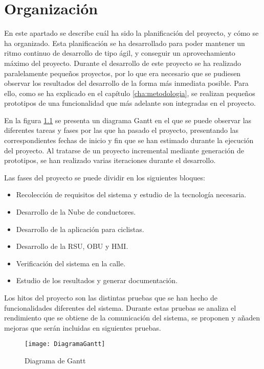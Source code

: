 \chapter{Organización}
En este apartado se describe cuál ha sido la planificación del proyecto, y cómo 
se ha organizado. Esta planificación se ha desarrollado para poder mantener un
ritmo continuo de desarrollo de tipo ágil, y conseguir un aprovechamiento máximo
del proyecto. Durante el desarrollo de este proyecto se ha realizado paralelamente
pequeños proyectos, por lo que era necesario que se pudiesen observar los resultados
del desarrollo de la forma más inmediata posible. Para ello, como se ha explicado
en el capítulo \ref{cha:metodologia}, se realizan pequeños prototipos de una
funcionalidad que más adelante son integradas en el proyecto.

En la figura \ref{fig:gantt} se presenta un diagrama Gantt en el que se puede observar
las diferentes tareas y fases por las que ha pasado el proyecto, presentando las
correspondientes fechas de inicio y fin que se han estimado durante la ejecución del
proyecto. Al tratarse de un proyecto incremental mediante generación de prototipos,
se han realizado varias iteraciones durante el desarrollo.

Las fases del proyecto se puede dividir en los siguientes bloques:
\begin{itemize}
	\item Recolección de requisitos del sistema y estudio de la tecnología necesaria.
	\item Desarrollo de la Nube de conductores.
	\item Desarrollo de la aplicación para ciclistas.
	\item Desarrollo de la RSU, OBU y HMI.
	\item Verificación del sistema en la calle.
	\item Estudio de los resultados y generar documentación.
\end{itemize}

Los hitos del proyecto son las distintas pruebas que se han hecho de funcionalidades
diferentes del sistema. Durante estas pruebas se analiza el rendimiento que se obtiene
de la comunicación del sistema, se proponen y añaden mejoras que serán incluidas en
siguientes pruebas.

\begin{figure}[t]
	 {
		\texttt{[image: DiagramaGantt]}
	}
	\caption{Diagrama de Gantt}
	\label{fig:gantt}
\end{figure}
